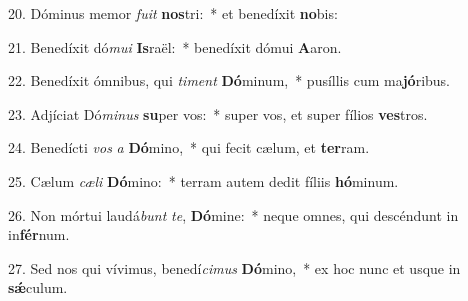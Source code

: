 20. Dóminus memor \textit{fu}\textit{it} \textbf{nos}tri:~*  et benedíxit \textbf{no}bis:\

21. Benedíxit dó\textit{mu}\textit{i} \textbf{Is}raël:~*  benedíxit dómui \textbf{A}aron.\

22. Benedíxit ómnibus, qui \textit{ti}\textit{ment} \textbf{Dó}minum,~*  pusíllis cum ma\textbf{jó}ribus.\

23. Adjíciat Dó\textit{mi}\textit{nus} \textbf{su}per vos:~*  super vos, et super fílios \textbf{ves}tros.\

24. Benedícti \textit{vos} \textit{a} \textbf{Dó}mino,~*  qui fecit cælum, et \textbf{ter}ram.\

25. Cælum \textit{cæ}\textit{li} \textbf{Dó}mino:~*  terram autem dedit fíliis \textbf{hó}minum.\

26. Non mórtui laudá\textit{bunt} \textit{te}, \textbf{Dó}mine:~*  neque omnes, qui descéndunt in in\textbf{fér}num.\

27. Sed nos qui vívimus, benedí\textit{ci}\textit{mus} \textbf{Dó}mino,~*  ex hoc nunc et usque in \textbf{sǽ}culum.\

